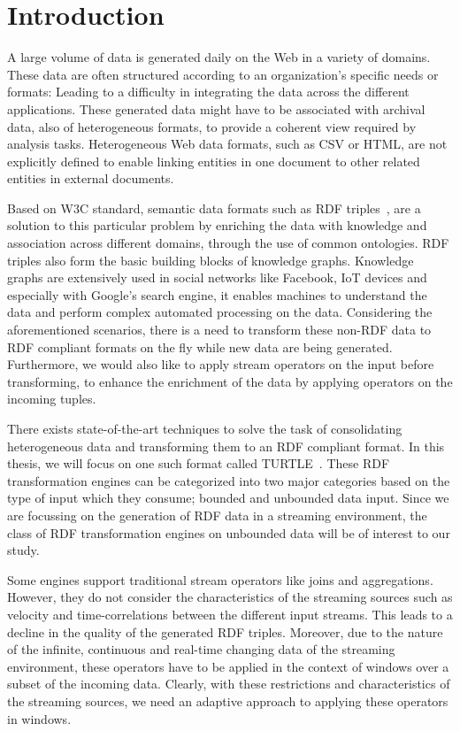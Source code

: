 \chapter{Introduction}

A large volume of data is generated daily on the Web in a variety of domains. These
data are often structured according to an organization's specific needs or formats: Leading to
a difficulty in integrating the data across the different applications.
These generated data might have to be associated with archival data, also of heterogeneous formats,
to provide a coherent view required by analysis tasks. Heterogeneous Web data formats, such as CSV or HTML, are not explicitly
defined to enable linking entities in one document to other related entities in external documents.

Based on W3C standard, semantic data formats such as RDF triples~\cite{intro_rdf}, are a solution to
this particular problem by enriching the data with knowledge and association across
different domains, through the use of common ontologies. RDF triples also form the basic building blocks of knowledge graphs.
Knowledge graphs are extensively used in social networks like Facebook\cite{facebook_linked_data}, IoT devices\cite{graph_of_things} and especially with Google's search
engine\cite{google_kg}, it enables machines to understand the data and perform complex automated processing
on the data. Considering the aforementioned scenarios, there is a need to transform these non-RDF data to RDF compliant formats on the fly while
new data are being generated. Furthermore, we would also like to apply stream operators on the input
before transforming, to enhance the enrichment of the data by applying operators on the incoming tuples.

There exists state-of-the-art techniques to solve the task of consolidating heterogeneous data
and transforming them to an RDF compliant format. In this thesis, we will focus on one such format called TURTLE~\cite{turtle_syntax}.
These RDF transformation engines can be categorized into two major categories based on the type of input
which they consume; bounded and unbounded data input. Since we are focussing on the generation of RDF data
in a streaming environment, the class of RDF transformation engines on unbounded data will be of interest to our study.

Some engines support traditional stream operators like joins and aggregations. However, they do not consider
the characteristics of the streaming sources such as velocity and time-correlations between the different
input streams. This leads to a decline in the quality of the generated RDF triples. Moreover,
due to the nature of the infinite, continuous and real-time changing data of the streaming environment,
these operators have to be applied in the context of windows over a subset of the incoming data.
Clearly, with these restrictions and characteristics of the streaming sources, we need an adaptive approach
to applying these operators in windows.


